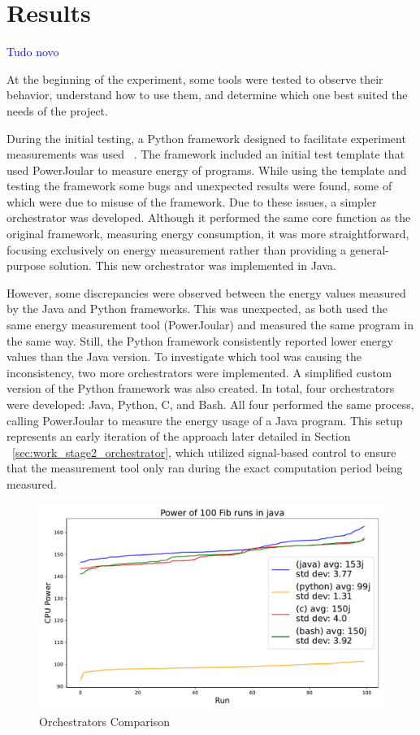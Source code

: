 \chapter{Results}\label{chapter:results}\textcolor{blue}{Tudo novo}

At the beginning of the experiment, some tools were tested to observe their behavior, understand how to use them, and determine which one best suited the needs of the project.

During the initial testing, a Python framework designed to facilitate experiment measurements was used ~\cite{S2_Group_Experiment_Runner}. The framework included an initial test template that used PowerJoular to measure energy of programs. While using the template and testing the framework some bugs and unexpected results were found, some of which were due to misuse of the framework.
Due to these issues, a simpler orchestrator was developed. Although it performed the same core function as the original framework, measuring energy consumption, it was more straightforward, focusing exclusively on energy measurement rather than providing a general-purpose solution. This new orchestrator was implemented in Java.

However, some discrepancies were observed between the energy values measured by the Java and Python frameworks. This was unexpected, as both used the same energy measurement tool (PowerJoular) and measured the same program in the same way. Still, the Python framework consistently reported lower energy values than the Java version.
To investigate which tool was causing the inconsistency, two more orchestrators were implemented. A simplified custom version of the Python framework was also created. In total, four orchestrators were developed: Java, Python, C, and Bash. All four performed the same process, calling PowerJoular to measure the energy usage of a Java program.
This setup represents an early iteration of the approach later detailed in Section ~\ref{sec:work_stage2_orchestrator}, which utilized signal-based control to ensure that the measurement tool only ran during the exact computation period being measured.

\begin{figure}[htbp]
  \centering
  \includegraphics[width = .8 \textwidth]{figures/4_orchs_comparison.pdf}
  \caption{Orchestrators Comparison}
  \label{fig:4_orchs_comparison}
\end{figure}

